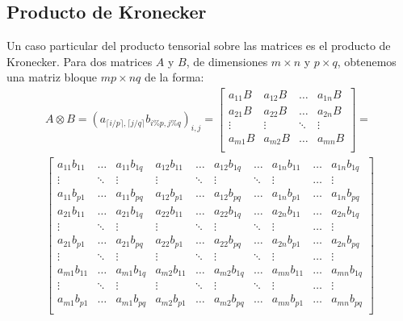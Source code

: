 \documentclass[paper=a4, fontsize=11pt, spanish]{scrartcl}
\numberwithin{equation}{section} %
\numberwithin{figure}{section} %
\numberwithin{table}{section} %
\begin{document}
  \subsection{Producto de Kronecker}
    Un caso particular del producto tensorial sobre las matrices es el producto de Kronecker.
    Para dos matrices $A$ y $B$, de dimensiones $m \times n$ y $p \times q$, obtenemos una matriz
    bloque $mp \times nq$ de la forma:
    \begin{multline*}
      A \otimes B = \left(a_{\lceil i/p \rceil, \lceil j/q \rceil} b_{i\%p,j\%q} \right)_{i,j}
	= \begin{bmatrix} 
	    a_{11}B & a_{12}B & \dots  & a_{1n}B \\
	    a_{21}B & a_{22}B & \dots  & a_{2n}B \\
	    \vdots  & \vdots  & \ddots & \vdots  \\
	    a_{m1}B & a_{m2}B & \dots  & a_{mn}B \\
	  \end{bmatrix}
	= \\ \begin{bmatrix} 
	    a_{11}b_{11} & \dots & a_{11}b_{1q} & a_{12}b_{11} & \dots & a_{12}b_{1q} & \dots  & a_{1n}b_{11} & \dots & a_{1n}b_{1q} \\
	    \vdots & \ddots & \vdots& \vdots & \ddots & \vdots & \ddots  & \vdots & \dots & \vdots \\
	    a_{11}b_{p1} & \dots & a_{11}b_{pq} & a_{12}b_{p1} & \dots & a_{12}b_{pq} & \dots  & a_{1n}b_{p1} & \dots & a_{1n}b_{pq} \\
	    a_{21}b_{11} & \dots & a_{21}b_{1q} & a_{22}b_{11} & \dots & a_{22}b_{1q} & \dots  & a_{2n}b_{11} & \dots & a_{2n}b_{1q} \\
	    \vdots & \ddots & \vdots& \vdots & \ddots & \vdots & \ddots  & \vdots & \dots & \vdots \\
	    a_{21}b_{p1} & \dots & a_{21}b_{pq} & a_{22}b_{p1} & \dots & a_{22}b_{pq} & \dots  & a_{2n}b_{p1} & \dots & a_{2n}b_{pq} \\ 
	    \vdots & \ddots & \vdots& \vdots & \ddots & \vdots & \ddots  & \vdots & \dots & \vdots \\    
	    a_{m1}b_{11} & \dots & a_{m1}b_{1q} & a_{m2}b_{11} & \dots & a_{m2}b_{1q} & \dots  & a_{mn}b_{11} & \dots & a_{mn}b_{1q} \\
	    \vdots & \ddots & \vdots& \vdots & \ddots & \vdots & \ddots  & \vdots & \dots & \vdots \\
	    a_{m1}b_{p1} & \dots & a_{m1}b_{pq} & a_{m2}b_{p1} & \dots & a_{m2}b_{pq} & \dots  & a_{mn}b_{p1} & \dots & a_{mn}b_{pq} \\	    
	    \end{bmatrix}
    \end{multline*}
    
\end{document}

